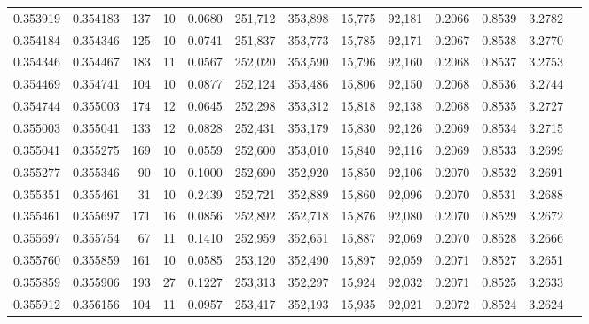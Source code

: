 \begin{tabular}{rrrrrrrrrrrrr}
0.353919 & 0.354183 &   137 &  10 &                                     0.0680 & 251,712 & 353,898 &  15,775 &  92,181 & 0.2066 & 0.8539 & 3.2782 \\
0.354184 & 0.354346 &   125 &  10 &                                     0.0741 & 251,837 & 353,773 &  15,785 &  92,171 & 0.2067 & 0.8538 & 3.2770 \\
0.354346 & 0.354467 &   183 &  11 &                                     0.0567 & 252,020 & 353,590 &  15,796 &  92,160 & 0.2068 & 0.8537 & 3.2753 \\
0.354469 & 0.354741 &   104 &  10 &                                     0.0877 & 252,124 & 353,486 &  15,806 &  92,150 & 0.2068 & 0.8536 & 3.2744 \\
0.354744 & 0.355003 &   174 &  12 &                                     0.0645 & 252,298 & 353,312 &  15,818 &  92,138 & 0.2068 & 0.8535 & 3.2727 \\
0.355003 & 0.355041 &   133 &  12 &                                     0.0828 & 252,431 & 353,179 &  15,830 &  92,126 & 0.2069 & 0.8534 & 3.2715 \\
0.355041 & 0.355275 &   169 &  10 &                                     0.0559 & 252,600 & 353,010 &  15,840 &  92,116 & 0.2069 & 0.8533 & 3.2699 \\
0.355277 & 0.355346 &    90 &  10 &                                     0.1000 & 252,690 & 352,920 &  15,850 &  92,106 & 0.2070 & 0.8532 & 3.2691 \\
0.355351 & 0.355461 &    31 &  10 &                                     0.2439 & 252,721 & 352,889 &  15,860 &  92,096 & 0.2070 & 0.8531 & 3.2688 \\
0.355461 & 0.355697 &   171 &  16 &                                     0.0856 & 252,892 & 352,718 &  15,876 &  92,080 & 0.2070 & 0.8529 & 3.2672 \\
0.355697 & 0.355754 &    67 &  11 &                                     0.1410 & 252,959 & 352,651 &  15,887 &  92,069 & 0.2070 & 0.8528 & 3.2666 \\
0.355760 & 0.355859 &   161 &  10 &                                     0.0585 & 253,120 & 352,490 &  15,897 &  92,059 & 0.2071 & 0.8527 & 3.2651 \\
0.355859 & 0.355906 &   193 &  27 &                                     0.1227 & 253,313 & 352,297 &  15,924 &  92,032 & 0.2071 & 0.8525 & 3.2633 \\
0.355912 & 0.356156 &   104 &  11 &                                     0.0957 & 253,417 & 352,193 &  15,935 &  92,021 & 0.2072 & 0.8524 & 3.2624 \\

\end{tabular}
